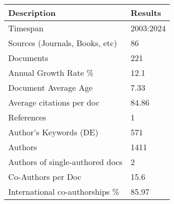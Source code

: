 
\begin{tabular}{ll}
\toprule
Description & Results\\
\midrule
Timespan & 2003:2024\\
Sources (Journals, Books, etc) & 86\\
Documents & 221\\
Annual Growth Rate \% & 12.1\\
Document Average Age & 7.33\\
\addlinespace
Average citations per doc & 84.86\\
References & 1\\
Author's Keywords (DE) & 571\\
Authors & 1411\\
Authors of single-authored docs & 2\\
\addlinespace
Co-Authors per Doc & 15.6\\
International co-authorships \% & 85.97\\
\bottomrule
\end{tabular}